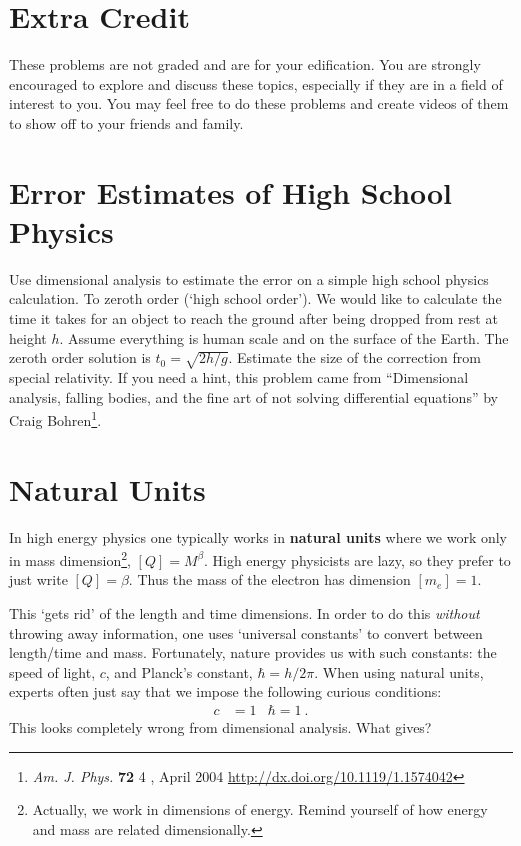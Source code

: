 \documentclass[12pt]{article}
\numberwithin{equation}{section}    %
\begin{document}
\appendix
\section*{Extra Credit}

These problems are not graded and are for your edification. You are strongly encouraged to explore and discuss these topics, especially if they are in a field of interest to you. You may feel free to do these problems and create videos of them to show off to your friends and family. 

\section{Error Estimates of High School Physics}

Use dimensional analysis to estimate the error on a simple high school physics calculation. To zeroth order (`high school order'). We would like to calculate the time it takes for an object to reach the ground after being dropped from rest at height $h$. Assume everything is human scale and on the surface of the Earth. The zeroth order solution is $t_0 = \sqrt{2h/g}$. Estimate the size of the correction from special relativity. If you need a hint, this problem came from ``Dimensional analysis, falling bodies, and the fine art of not solving differential equations'' by Craig Bohren\footnote{\emph{Am. J. Phys.} \textbf{72}  4 , April 2004 \url{http://dx.doi.org/10.1119/1.1574042}}. 

\section{Natural Units}

In high energy physics one typically works in \textbf{natural units} where we work only in mass dimension\footnote{Actually, we work in dimensions of energy. Remind yourself of how energy and mass are related dimensionally.}, $[Q] = M^\beta$. High energy physicists are lazy, so they prefer to just write $[Q]=\beta$. Thus the mass of the electron has dimension $[m_e] = 1$. 

This `gets rid' of the length and time dimensions. In order to do this \emph{without} throwing away information, one uses `universal constants' to convert between length/time and mass. Fortunately, nature provides us with such constants: the speed of light, $c$, and Planck's constant, $\hbar = h/2\pi$. When using natural units, experts often just say that we impose the following curious conditions:
\begin{align}
	c &= 1 
	&
	\hbar = 1 \ .
\end{align}
This looks completely wrong from dimensional analysis. What gives?
\end{document}
